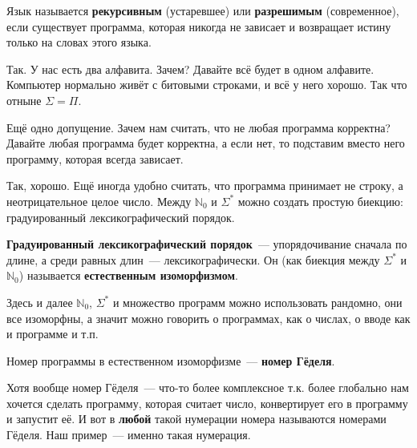 \documentclass{article}
\begin{document}
    \begin{definition}
        Язык называется \textbf{рекурсивным} (устаревшее) или \textbf{разрешимым} (современное), если существует программа, которая никогда не зависает и возвращает истину только на словах этого языка.
    \end{definition}
    \begin{remark}
        Так. У нас есть два алфавита. Зачем? Давайте всё будет в одном алфавите. Компьютер нормально живёт с битовыми строками, и всё у него хорошо. Так что отныне $\Sigma=\Pi$.
    \end{remark}
    \begin{remark}
        Ещё одно допущение. Зачем нам считать, что не любая программа корректна? Давайте любая программа будет корректна, а если нет, то подставим вместо него программу, которая всегда зависает.
    \end{remark}
    \begin{remark}
        Так, хорошо. Ещё иногда удобно считать, что программа принимает не строку, а неотрицательное целое число. Между $\mathbb N_0$ и $\Sigma^*$ можно создать простую биекцию: градуированный лексикографический порядок.
    \end{remark}
    \begin{definition}
        \textbf{Градуированный лексикографический порядок}~--- упорядочивание сначала по длине, а среди равных длин~--- лексикографически. Он (как биекция между $\Sigma^*$ и $\mathbb N_0$) называется \textbf{естественным изоморфизмом}.
    \end{definition}
    \begin{remark}
        Здесь и далее $\mathbb N_0$, $\Sigma^*$ и множество программ можно использовать рандомно, они все изоморфны, а значит можно говорить о программах, как о числах, о вводе как и программе и т.п.
    \end{remark}
    \begin{definition}
        Номер программы в естественном изоморфизме~--- \textbf{номер Гёделя}.
    \end{definition}
    \begin{remark}
        Хотя вообще номер Гёделя~--- что-то более комплексное т.к. более глобально нам хочется сделать программу, которая считает число, конвертирует его в программу и запустит её. И вот в \textbf{любой} такой нумерации номера называются номерами Гёделя. Наш пример~--- именно такая нумерация.
    \end{remark}
\end{document}
